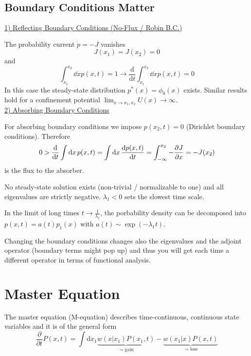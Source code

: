 \documentclass{notebook}
\begin{document}
\subsection*{Boundary Conditions Matter}

\underline{1) Reflecting Boundary Conditions (No-Flux / Robin B.C.)}

The probability current $\dot{p} = -J$ vanishes
%
\begin{equation}
J(x_1) = J(x_2) = 0
\end{equation}
%
and
%
\begin{equation}
\int_{x_1}^{x_2} \dd{x} p(x,t) = 1 \rightarrow
\frac{\mathrm{d}}{\mathrm{d}t} \int_{x_1}^{x_2} \dd{x} p(x,t) = 0
\end{equation}
%
In this case the steady-state distribution $p^*(x) = \phi_0(x)$ exists. Similar results hold for a confinement potential $\lim_{x \to x_1, x_2} U(x) \to \infty$. \\

\underline{2) Absorbing Boundary Conditions}

For absorbing boundary conditions we impose $p(x_2,t) = 0$ (Dirichlet boundary conditions). Therefore
%
\begin{equation}
0 > \dv{t} \int \dd{x} p(x,t) = \int \dd{x} \dv{p(x,t)}{t} = \int_{-\infty}^{x_2} -\pdv{J}{x} = -J(x_2)
\end{equation}
%
is the flux to the absorber. 

No steady-state solution exists (non-trivial / normalizable to one) and all eigenvalues are strictly negative. $\lambda_1 < 0$ sets the slowest time scale.

In the limit of long times $t \to \frac{1}{\lambda_1}$, the porbability density can be decomposed into $p(x,t) = a(t) p_1(x)$ with $a(t) \sim \exp(-\lambda_1 t)$. 

\begin{remark}
	Changing the boundary conditions changes also the eigenvalues and the adjoint operator (boundary terms might pop up) and thus you will get each time a different operator in terms of functional analysis. 
\end{remark}


\section{Master Equation}

The master equation (M-equation) describes time-continuous, continuous state variables and it is of the general form
%
\begin{equation}
	\frac{\partial}{\partial t} P(x,t) = \int \mathrm{d}x_1 \underbrace{w(x|x_1) P(x_1,t)}_{= \mathrm{gain}} - \underbrace{w(x_1|x) P(x,t)}_{= \mathrm{loss}}
\end{equation}
%
\end{document}
